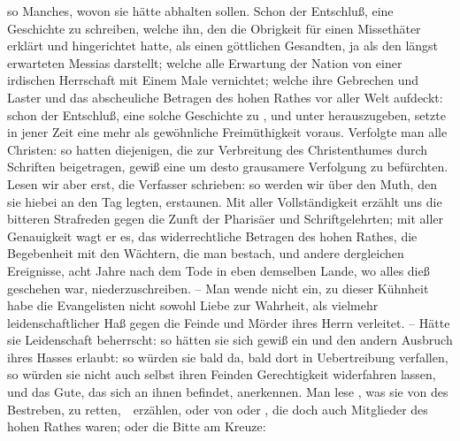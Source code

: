\begin{aufza}
\begin{aufzb}
\item so Manches, wovon sie  hätte abhalten sollen. Schon der Entschluß, eine Geschichte  zu schreiben, welche ihn, den die Obrigkeit für einen Missethäter erklärt und hingerichtet hatte, als einen göttlichen Gesandten, ja als den längst erwarteten Messias darstellt; welche alle Erwartung der Nation von einer irdischen Herrschaft mit Einem Male vernichtet; welche ihre Gebrechen und Laster und das abscheuliche Betragen des hohen Rathes vor aller Welt aufdeckt: schon der Entschluß, eine solche Geschichte zu , und unter  herauszugeben, setzte in jener Zeit eine mehr als gewöhnliche Freimüthigkeit voraus. Verfolgte man alle Christen: so hatten diejenigen, die zur Verbreitung des Christenthumes durch Schriften beigetragen, gewiß eine um desto grausamere Verfolgung zu befürchten. Lesen wir aber erst,   die Verfasser schrieben: so werden wir über den Muth, den sie hiebei an den Tag legten, erstaunen. Mit aller Vollständigkeit erzählt uns  die bitteren Strafreden  gegen die Zunft der Pharisäer und Schriftgelehrten; mit aller Genauigkeit wagt er es, das widerrechtliche Betragen des hohen Rathes, die Begebenheit mit den Wächtern, die man bestach, und andere dergleichen Ereignisse, acht Jahre nach dem Tode  in eben demselben Lande, wo alles dieß geschehen war, niederzuschreiben. -- Man wende nicht ein, zu dieser Kühnheit habe die Evangelisten nicht sowohl Liebe zur Wahrheit, als vielmehr leidenschaftlicher Haß gegen die Feinde und Mörder ihres Herrn verleitet. -- Hätte sie Leidenschaft beherrscht: so hätten sie sich gewiß ein und den andern Ausbruch ihres Hasses erlaubt: so würden sie bald da, bald dort in Uebertreibung verfallen, so würden sie nicht auch selbst ihren Feinden Gerechtigkeit widerfahren lassen, und das Gute, das sich an ihnen befindet, anerkennen. Man lese \zB , was sie von des  Bestreben,  zu retten,~\ erzählen, oder von  oder , die doch auch Mitglieder des hohen Rathes waren; oder die Bitte  am Kreuze:  \udgl\ 

\end{aufzb}
\end{aufza}
